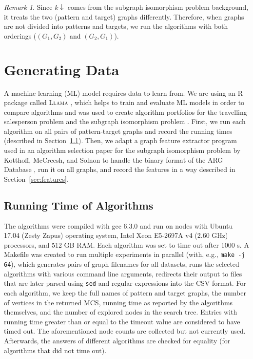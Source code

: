 \documentclass{l4proj}
\theoremstyle{definition}
\theoremstyle{remark}
\newtheorem{remark}{Remark}[chapter]
\begin{document}
\begin{remark}
  Since $k{\downarrow}$ comes from the subgraph isomorphism problem background, it
  treats the two (pattern and target) graphs differently. Therefore, when graphs
  are not divided into patterns and targets, we run the algorithms with both
  orderings ($(G_1, G_2)$ and $(G_2, G_1)$).
\end{remark}

\chapter{Generating Data} \label{chapter:generating_data}

A machine learning (ML) model requires data to learn from. We are using an R
package called \textsc{Llama} \cite{kotthoff_llama_2013, llama}, which helps to train
and evaluate ML models in order to compare algorithms and was used to create
algorithm portfolios for the travelling salesperson problem
\cite{DBLP:conf/lion/KotthoffKHT15} and the subgraph isomorphism problem
\cite{DBLP:conf/lion/KotthoffMS16}. First, we run each algorithm on all pairs of
pattern-target graphs and record the running times (described in
Section~\ref{sec:runtimes}). Then, we adapt a graph feature extractor program
used in an algorithm selection paper for the subgraph isomorphism problem by
Kotthoff, McCreesh, and Solnon \cite{DBLP:conf/lion/KotthoffMS16} to handle the
binary format of the ARG Database \cite{foggia2001-2,
  DBLP:journals/prl/SantoFSV03}, run it on all graphs, and record the features
in a way described in Section~\ref{sec:features}.

\section{Running Time of Algorithms} \label{sec:runtimes}

The algorithms were compiled with gcc 6.3.0 and run on nodes with Ubuntu 17.04
(Zesty Zapus) operating system, Intel Xeon E5-2697A v4 (2.60 GHz) processors,
and 512 GB RAM. Each algorithm was set to time out after \num{1000} s. A
Makefile was created to run multiple experiments in parallel (with, e.g.,
\texttt{make -j 64}), which generates pairs of graph filenames for all datasets,
runs the selected algorithms with various command line arguments, redirects
their output to files that are later parsed using \texttt{sed} and regular
expressions into the CSV format. For each algorithm, we keep the full names of
pattern and target graphs, the number of vertices in the returned MCS, running
time as reported by the algorithms themselves, and the number of explored nodes
in the search tree. Entries with running time greater than or equal to the
timeout value are considered to have timed out. The aforementioned node counts
are collected but not currently used. Afterwards, the answers of different
algorithms are checked for equality (for algorithms that did not time out).
\end{document}

